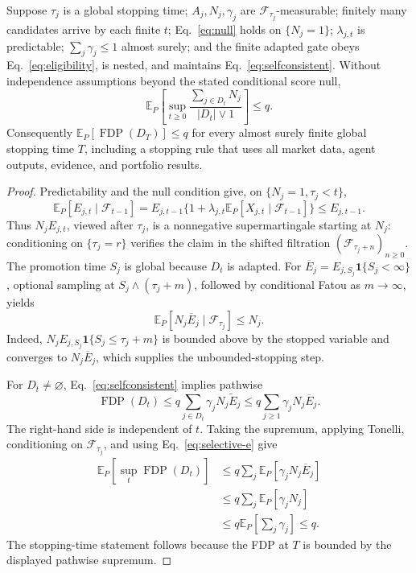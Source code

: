 \begin{theorem}
\label{thm:main}
Suppose \(\tau_j\) is a global stopping time; \(A_j,N_j,\gamma_j\) are
\(\mathcal F_{\tau_j}\)-measurable; finitely many candidates arrive by each
finite \(t\); Eq.~\eqref{eq:null} holds on \(\{N_j=1\}\);
\(\lambda_{j,t}\) is predictable; \(\sum_j\gamma_j\le1\) almost surely; and
the finite adapted gate obeys Eq.~\eqref{eq:eligibility}, is nested, and
maintains Eq.~\eqref{eq:selfconsistent}.
Without independence assumptions beyond the stated conditional score null,
\begin{equation}
\mathbb E_P\!\left[\sup_{t\ge0}
\frac{\sum_{j\in D_t}N_j}{|D_t|\vee1}\right]\le q.
\label{eq:supfdr}
\end{equation}
Consequently
\(\mathbb E_P[\operatorname{FDP}(D_T)]\le q\) for every almost surely finite
global stopping time \(T\), including a stopping rule that uses all market
data, agent outputs, evidence, and portfolio results.
\end{theorem}

\begin{proof}
Predictability and the null condition give, on \(\{N_j=1,\tau_j<t\}\),
\[
\mathbb E_P[E_{j,t}\mid\mathcal F_{t-1}]
=E_{j,t-1}\{1+\lambda_{j,t}
\mathbb E_P[X_{j,t}\mid\mathcal F_{t-1}]\}
\le E_{j,t-1}.
\]
Thus \(N_jE_{j,t}\), viewed after \(\tau_j\), is a nonnegative
supermartingale starting at \(N_j\): conditioning on
\(\{\tau_j=r\}\) verifies the claim in the shifted filtration
\((\mathcal F_{\tau_j+n})_{n\ge0}\).  The promotion time \(S_j\) is global
because \(D_t\) is adapted.  For
\(\overline E_j=E_{j,S_j}\mathbf1\{S_j<\infty\}\), optional sampling at
\(S_j\wedge(\tau_j+m)\), followed by conditional Fatou as \(m\to\infty\),
yields
\begin{equation}
\mathbb E_P[N_j\overline E_j\mid\mathcal F_{\tau_j}]\le N_j.
\label{eq:selective-e}
\end{equation}
Indeed,
\(N_jE_{j,S_j}\mathbf1\{S_j\le\tau_j+m\}\) is bounded above by the stopped
variable and converges to \(N_j\overline E_j\), which supplies the
unbounded-stopping step.

For \(D_t\ne\varnothing\), Eq.~\eqref{eq:selfconsistent} implies pathwise
\[
\operatorname{FDP}(D_t)
\le q\sum_{j\in D_t}\gamma_jN_j\widetilde E_j
\le q\sum_{j\ge1}\gamma_jN_j\overline E_j.
\]
The right-hand side is independent of \(t\).  Taking the supremum, applying
Tonelli, conditioning on \(\mathcal F_{\tau_j}\), and using
Eq.~\eqref{eq:selective-e} give
\begin{align*}
\mathbb E_P[\sup_t\operatorname{FDP}(D_t)]
&\le q\sum_j\mathbb E_P[\gamma_jN_j\overline E_j]\\
&\le q\sum_j\mathbb E_P[\gamma_jN_j]\\
&\le q\mathbb E_P\!\left[\sum_j\gamma_j\right]\le q.
\end{align*}
The stopping-time statement follows because the FDP at \(T\) is bounded by
the displayed pathwise supremum.
\end{proof}

